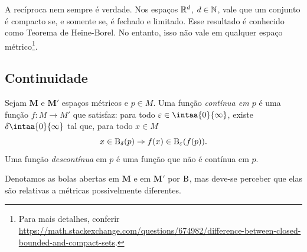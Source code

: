 A recíproca nem sempre é verdade. Nos espaços $\mathbb{R}^d$, $ d \in \mathbb{N}$, vale que um conjunto é compacto se, e somente se, é fechado e limitado. Esse resultado é conhecido como Teorema de Heine-Borel. No entanto, isso não vale em qualquer espaço métrico\footnote{Para mais detalhes, conferir \url{https://math.stackexchange.com/questions/674982/difference-between-closed-bounded-and-compact-sets}.}.

\subsection{Continuidade}

\begin{defi}
Sejam $\bm M$ e $\bm M'$ espaços métricos e $p \in M$. Uma função \emph{contínua em $p$} é uma função $f\colon M \to M'$ que satisfaz: para todo $\varepsilon \in \intaa{0}{\infty}$, existe $\delta \intaa{0}{\infty}$ tal que, para todo $x \in M$
	\begin{equation*}
	x \in \mathrm{B}_\delta(p) \Rightarrow f(x) \in \mathrm{B}_\varepsilon(f(p)).
	\end{equation*}
Uma função \emph{descontínua} em $p$ é uma função que não é contínua em $p$.
\end{defi}

Denotamos as bolas abertas em $\bm M$ e em $\bm M'$ por $\mathrm{B}$, mas deve-se perceber que elas são relativas a métricas possivelmente diferentes.

